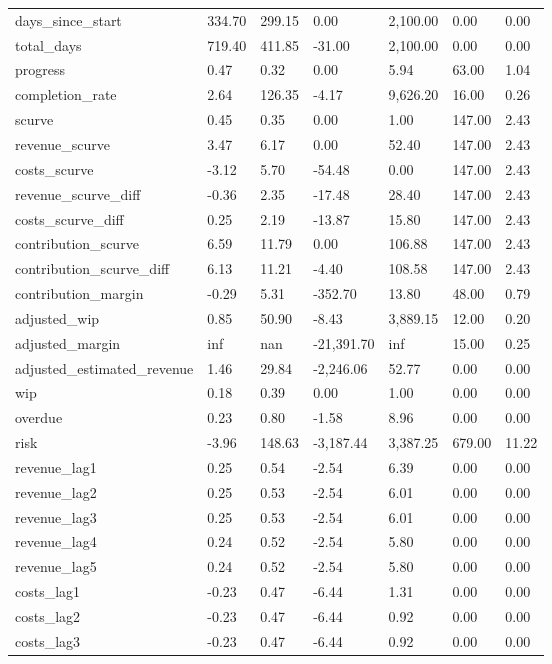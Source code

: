 \begin{landscape}
\begin{longtable}[h!]{lllllll}
days_since_start & 334.70 & 299.15 & 0.00 & 2,100.00 & 0.00 & 0.00 \\
total_days & 719.40 & 411.85 & -31.00 & 2,100.00 & 0.00 & 0.00 \\
progress & 0.47 & 0.32 & 0.00 & 5.94 & 63.00 & 1.04 \\
completion_rate & 2.64 & 126.35 & -4.17 & 9,626.20 & 16.00 & 0.26 \\
scurve & 0.45 & 0.35 & 0.00 & 1.00 & 147.00 & 2.43 \\
revenue_scurve & 3.47 & 6.17 & 0.00 & 52.40 & 147.00 & 2.43 \\
costs_scurve & -3.12 & 5.70 & -54.48 & 0.00 & 147.00 & 2.43 \\
revenue_scurve_diff & -0.36 & 2.35 & -17.48 & 28.40 & 147.00 & 2.43 \\
costs_scurve_diff & 0.25 & 2.19 & -13.87 & 15.80 & 147.00 & 2.43 \\
contribution_scurve & 6.59 & 11.79 & 0.00 & 106.88 & 147.00 & 2.43 \\
contribution_scurve_diff & 6.13 & 11.21 & -4.40 & 108.58 & 147.00 & 2.43 \\
contribution_margin & -0.29 & 5.31 & -352.70 & 13.80 & 48.00 & 0.79 \\
adjusted_wip & 0.85 & 50.90 & -8.43 & 3,889.15 & 12.00 & 0.20 \\
adjusted_margin & inf & nan & -21,391.70 & inf & 15.00 & 0.25 \\
adjusted_estimated_revenue & 1.46 & 29.84 & -2,246.06 & 52.77 & 0.00 & 0.00 \\
wip & 0.18 & 0.39 & 0.00 & 1.00 & 0.00 & 0.00 \\
overdue & 0.23 & 0.80 & -1.58 & 8.96 & 0.00 & 0.00 \\
risk & -3.96 & 148.63 & -3,187.44 & 3,387.25 & 679.00 & 11.22 \\
revenue_lag1 & 0.25 & 0.54 & -2.54 & 6.39 & 0.00 & 0.00 \\
revenue_lag2 & 0.25 & 0.53 & -2.54 & 6.01 & 0.00 & 0.00 \\
revenue_lag3 & 0.25 & 0.53 & -2.54 & 6.01 & 0.00 & 0.00 \\
revenue_lag4 & 0.24 & 0.52 & -2.54 & 5.80 & 0.00 & 0.00 \\
revenue_lag5 & 0.24 & 0.52 & -2.54 & 5.80 & 0.00 & 0.00 \\
costs_lag1 & -0.23 & 0.47 & -6.44 & 1.31 & 0.00 & 0.00 \\
costs_lag2 & -0.23 & 0.47 & -6.44 & 0.92 & 0.00 & 0.00 \\
costs_lag3 & -0.23 & 0.47 & -6.44 & 0.92 & 0.00 & 0.00 \\

\end{longtable}
\end{landscape}

